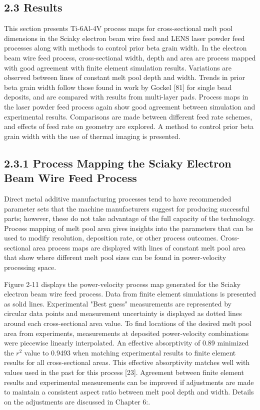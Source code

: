 \documentclass[10pt]{article}
\begin{document}
\subsection*{2.3 Results}
This section presents Ti-6Al-4V process maps for cross-sectional melt pool dimensions in the Sciaky electron beam wire feed and LENS laser powder feed processes along with methods to control prior beta grain width. In the electron beam wire feed process, cross-sectional width, depth and area are process mapped with good agreement with finite element simulation results. Variations are observed between lines of constant melt pool depth and width. Trends in prior beta grain width follow those found in work by Gockel [81] for single bead deposits, and are compared with results from multi-layer pads. Process maps in the laser powder feed process again show good agreement between simulation and experimental results. Comparisons are made between different feed rate schemes, and effects of feed rate on geometry are explored. A method to control prior beta grain width with the use of thermal imaging is presented.

\subsection*{2.3.1 Process Mapping the Sciaky Electron Beam Wire Feed Process}
Direct metal additive manufacturing processes tend to have recommended parameter sets that the machine manufacturers suggest for producing successful parts; however, these do not take advantage of the full capacity of the technology. Process mapping of melt pool area gives insights into the parameters that can be used to modify resolution, deposition rate, or other process outcomes. Cross-sectional area process maps are displayed with lines of constant melt pool area that show where different melt pool sizes can be found in power-velocity processing space.

Figure 2-11 displays the power-velocity process map generated for the Sciaky electron beam wire feed process. Data from finite element simulations is presented as solid lines. Experimental "Best guess" measurements are represented by circular data points and measurement uncertainty is displayed as dotted lines around each cross-sectional area value. To find locations of the desired melt pool area from experiments, measurements at deposited power-velocity combinations were piecewise linearly interpolated. An effective absorptivity of 0.89 minimized the $r^{2}$ value to 0.9493 when matching experimental results to finite element results for all cross-sectional areas. This effective absorptivity matches well with values used in the past for this process [23]. Agreement between finite element results and experimental measurements can be improved if adjustments are made to maintain a consistent aspect ratio between melt pool depth and width. Details on the adjustments are discussed in Chapter 6:.
\end{document}
